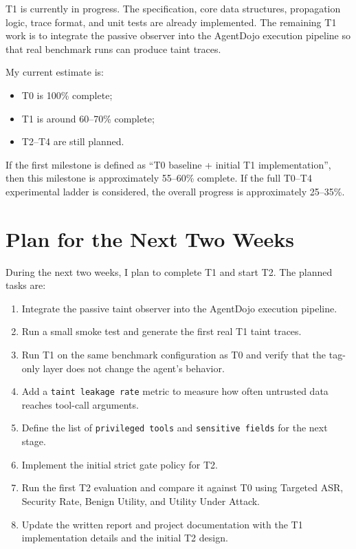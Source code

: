 \documentclass[11pt,a4paper]{article}
\begin{document}
T1 is currently in progress. The specification, core data structures, propagation logic, trace format, and unit tests are already implemented. The remaining T1 work is to integrate the passive observer into the AgentDojo execution pipeline so that real benchmark runs can produce taint traces.

My current estimate is:

\begin{itemize}
  \item T0 is 100\% complete;
  \item T1 is around 60--70\% complete;
  \item T2--T4 are still planned.
\end{itemize}

If the first milestone is defined as ``T0 baseline + initial T1 implementation'', then this milestone is approximately 55--60\% complete. If the full T0--T4 experimental ladder is considered, the overall progress is approximately 25--35\%.

\section{Plan for the Next Two Weeks}

During the next two weeks, I plan to complete T1 and start T2. The planned tasks are:

\begin{enumerate}
  \item Integrate the passive taint observer into the AgentDojo execution pipeline.
  \item Run a small smoke test and generate the first real T1 taint traces.
  \item Run T1 on the same benchmark configuration as T0 and verify that the tag-only layer does not change the agent's behavior.
  \item Add a \texttt{taint leakage rate} metric to measure how often untrusted data reaches tool-call arguments.
  \item Define the list of \texttt{privileged tools} and \texttt{sensitive fields} for the next stage.
  \item Implement the initial strict gate policy for T2.
  \item Run the first T2 evaluation and compare it against T0 using Targeted ASR, Security Rate, Benign Utility, and Utility Under Attack.
  \item Update the written report and project documentation with the T1 implementation details and the initial T2 design.
\end{enumerate}
\end{document}
